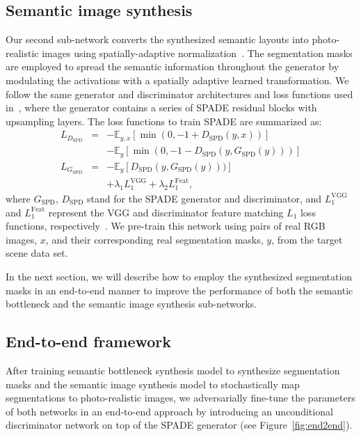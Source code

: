 \documentclass[10pt,twocolumn,letterpaper]{article}
\begin{document}
\subsection{Semantic image synthesis}
\label{SIS}
Our second sub-network converts the synthesized semantic layouts into photo-realistic images using spatially-adaptive normalization~\cite{SPADE}. The segmentation masks are employed to spread the semantic information throughout the generator by modulating the activations with a spatially adaptive learned transformation. We follow the same generator and discriminator architectures and loss functions used in~\cite{SPADE}, where the generator contains a series of SPADE residual blocks with upsampling layers. The loss functions to train SPADE are summarized as:
\begin{eqnarray}
 L_{D_{\text{SPD}}} &=& -\mathbb{E}_{y,x} [\min(0, -1 + D_{\text{SPD}}(y, x))] \nonumber\\
 && -\mathbb{E}_{y} [\min(0, -1-D_{\text{SPD}}(y,G_{\text{SPD}}(y)))] \nonumber \\
 L_{G_{\text{SPD}}} &=&  -\mathbb{E}_{y} [D_{\text{SPD}}(y, G_{\text{SPD}}(y)))] \label{eq:SPD}\\
 && + \lambda_1 L_1^{\text{VGG}} + \lambda_2 L_1^{\text{Feat}}, \nonumber
\end{eqnarray} where $G_{\text{SPD}}$, $D_{\text{SPD}}$ stand for the SPADE generator and discriminator, and $L_1^{\text{VGG}}$ and $L_1^{\text{Feat}}$ represent the VGG and discriminator feature matching $L_1$ loss functions, respectively~\cite{SPADE, pix2pixHD}. We pre-train this network using pairs of real RGB images, $x$, and their corresponding real segmentation masks, $y$, from the target scene data set.

In the next section, we will describe how to employ the synthesized segmentation masks in an end-to-end manner to improve the performance of both the semantic bottleneck and the semantic image synthesis sub-networks.
 
\subsection{End-to-end framework}
 After training semantic bottleneck synthesis model to synthesize segmentation masks and the semantic image synthesis model to stochastically map segmentations to photo-realistic images, we adversarially fine-tune the parameters of both networks in an end-to-end approach by introducing an unconditional discriminator network on top of the SPADE generator (see Figure~\ref{fig:end2end}).
 
\end{document}
